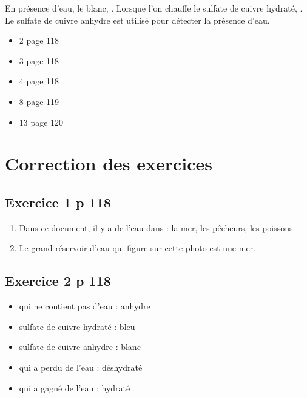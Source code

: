 \documentclass[12pt,a4paper]{article}
\begin{document}
\begin{mybilan}
	En présence d'eau, le  blanc, .
	Lorsque l'on chauffe le sulfate de cuivre hydraté, .
	Le sulfate de cuivre anhydre est utilisé pour détecter la présence d'eau.
\end{mybilan}

\begin{myexos}
	\begin{multicols}{2}
	
		\begin{itemize}
			\item 2 page 118
			\item 3 page 118
			\item 4 page 118
			\item 8 page 119
			\item 13 page 120
		\end{itemize}
	
	\end{multicols}
\end{myexos}


\appendix

\newpage

\section*{Correction des exercices}

\subsection*{Exercice 1 p 118}

\begin{enumerate}[label=\alph*)]
	\item Dans ce document, il y a de l'eau dans : la mer, les pêcheurs, les poissons.
	\item Le grand réservoir d'eau qui figure sur cette photo est une mer.
\end{enumerate}

\subsection*{Exercice 2 p 118}

\begin{multicols}{2}
	\begin{itemize}
		\item qui ne contient pas d'eau : anhydre
		\item sulfate de cuivre hydraté : bleu
		\item sulfate de cuivre anhydre : blanc
		\item qui a perdu de l'eau : déshydraté
		\item qui a gagné de l'eau : hydraté
	\end{itemize}
\end{multicols}
\end{document}
